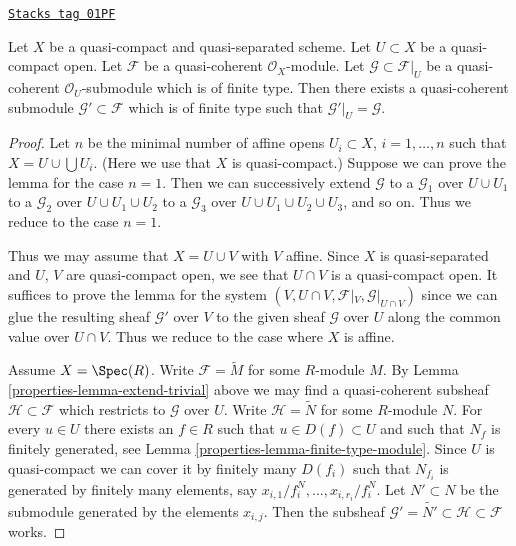 \begin{lemma}[Extend]
\label{properties-lemma-extend}
\href{https://stacks.math.columbia.edu/tag/01PF}{\texttt{Stacks tag 01PF}}

Let $X$ be a quasi-compact and quasi-separated scheme.
Let $U \subset X$ be a quasi-compact open.
Let $\mathcal{F}$ be a quasi-coherent $\mathcal{O}_X$-module.
Let $\mathcal{G} \subset \mathcal{F}|_U$ be a quasi-coherent
$\mathcal{O}_U$-submodule which is of finite type. Then
there exists a quasi-coherent submodule $\mathcal{G}' \subset \mathcal{F}$
which is of finite type such that $\mathcal{G}'|_U = \mathcal{G}$.
\end{lemma}

\begin{proof}

Let $n$ be the minimal number of affine opens $U_i \subset X$,
$i = 1, \ldots , n$ such that $X = U \cup \bigcup U_i$.
(Here we use that $X$ is quasi-compact.) Suppose
we can prove the lemma for the case $n = 1$. Then we can successively
extend $\mathcal{G}$
to a $\mathcal{G}_1$ over $U \cup U_1$
to a $\mathcal{G}_2$ over $U \cup U_1 \cup U_2$
to a $\mathcal{G}_3$ over $U \cup U_1 \cup U_2 \cup U_3$,
and so on.
Thus we reduce to the case $n = 1$.

\medskip\noindent
Thus we may assume that $X = U \cup V$ with $V$ affine.
Since $X$ is quasi-separated and $U$, $V$ are quasi-compact open,
we see that $U \cap V$ is a quasi-compact open. It suffices to prove the
lemma for the system $(V, U \cap V, \mathcal{F}|_V, \mathcal{G}|_{U \cap V})$
since we can glue the resulting sheaf $\mathcal{G}'$ over $V$
to the given sheaf $\mathcal{G}$ over $U$ along the common value
over $U \cap V$.
Thus we reduce to the case where $X$ is affine.

\medskip\noindent
Assume $X = \Spec(R)$. Write $\mathcal{F} = \widetilde M$
for some $R$-module $M$. By Lemma \ref{properties-lemma-extend-trivial} above we may
find a quasi-coherent subsheaf $\mathcal{H} \subset \mathcal{F}$
which restricts to $\mathcal{G}$ over $U$.
Write $\mathcal{H} = \widetilde N$ for some $R$-module $N$.
For every $u \in U$ there exists an $f \in R$ such that
$u \in D(f) \subset U$ and such that $N_f$ is finitely generated,
see Lemma \ref{properties-lemma-finite-type-module}.
Since $U$ is quasi-compact we can cover it by finitely
many $D(f_i)$ such that $N_{f_i}$ is generated by
finitely many elements, say $x_{i, 1}/f_i^N, \ldots, x_{i, r_i}/f_i^N$.
Let $N' \subset N$ be the submodule generated by the elements
$x_{i, j}$. Then the subsheaf
$\mathcal{G}' = \widetilde{N'} \subset \mathcal{H} \subset \mathcal{F}$
works.
\end{proof}

